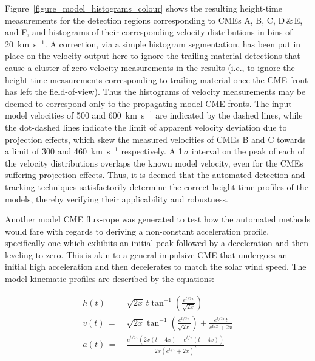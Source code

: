 \documentclass[preprint2]{aastex}
\begin{document}
Figure~\ref{figure_model_histograms_colour} shows the resulting height-time measurements for the detection regions corresponding to CMEs A, B, C, D\,\&\,E, and F, and histograms of their corresponding velocity distributions in bins of 20~km~s$^{-1}$. A correction, via a simple histogram segmentation, has been put in place on the velocity output here to ignore the trailing material detections that cause a cluster of zero velocity measurements in the results (i.e., to ignore the height-time measurements corresponding to trailing material once the CME front has left the field-of-view). Thus the histograms of velocity measurements may be deemed to correspond only to the propagating model CME fronts. The input model velocities of 500 and 600~km~s$^{-1}$ are indicated by the dashed lines, while the dot-dashed lines indicate the limit of apparent velocity deviation due to projection effects, which skew the measured velocities of CMEs B and C towards a limit of 300 and 460~km~s$^{-1}$ respectively. A 1\,$\sigma$ interval on the peak of each of the velocity distributions overlaps the known model velocity, even for the CMEs suffering projection effects. Thus, it is deemed that the automated detection and tracking techniques satisfactorily determine the correct height-time profiles of the models, thereby verifying their applicability and robustness.

Another model CME flux-rope was generated to test how the automated methods would fare with regards to deriving a non-constant acceleration profile, specifically one which exhibits an initial peak followed by a deceleration and then leveling to zero. This is akin to a general impulsive CME that undergoes an initial high acceleration and then decelerates to match the solar wind speed. The model kinematic profiles are described by the equations:

\begin{eqnarray}
h(t)\,=&\,\sqrt{2x}\,t\tan^{-1}\left(\frac{e^{t/2x}}{\sqrt{2x}}\right) \\
v(t)\,=&\,\sqrt{2x}\tan^{-1}\left(\frac{e^{t/2x}}{\sqrt{2x}}\right)+\frac{e^{t/2x}t}{e^{t/x}+2x} \\
a(t)\,=&\,\frac{e^{t/2x}\left(2x\left(t+4x\right)-e^{t/x}\left(t-4x\right)\right)}{2x\left(e^{t/x}+2x\right)^2}
\end{eqnarray}
\end{document}

